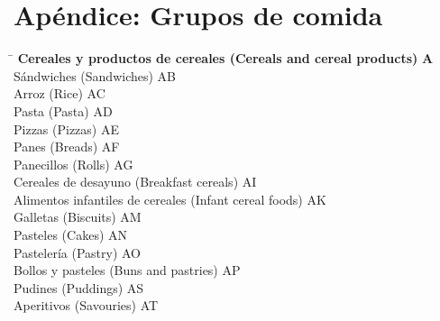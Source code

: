 \chapter{Apéndice: Grupos de comida}
\label{ch:grupos-comida}

\begin{small}
    \begin{tabbing}
    \hspace{15cm} \= \hspace{0cm} \kill
        \textbf{Cereales y productos de cereales (Cereals and cereal products)} \> \textbf{A} \\
            \hspace{0.5cm}Sándwiches (Sandwiches) \> AB \\
            \hspace{0.5cm}Arroz (Rice) \> AC \\
            \hspace{0.5cm}Pasta (Pasta) \> AD \\
            \hspace{0.5cm}Pizzas (Pizzas) \> AE \\
            \hspace{0.5cm}Panes (Breads) \> AF \\
            \hspace{0.5cm}Panecillos (Rolls) \> AG \\
            \hspace{0.5cm}Cereales de desayuno (Breakfast cereals) \> AI \\
            \hspace{0.5cm}Alimentos infantiles de cereales (Infant cereal foods) \> AK \\
            \hspace{0.5cm}Galletas (Biscuits) \> AM \\
            \hspace{0.5cm}Pasteles (Cakes) \> AN \\
            \hspace{0.5cm}Pastelería (Pastry) \> AO \\
            \hspace{0.5cm}Bollos y pasteles (Buns and pastries) \> AP \\
            \hspace{0.5cm}Pudines (Puddings) \> AS \\
            \hspace{0.5cm}Aperitivos (Savouries) \> AT \\
    \end{tabbing}


\end{small}
